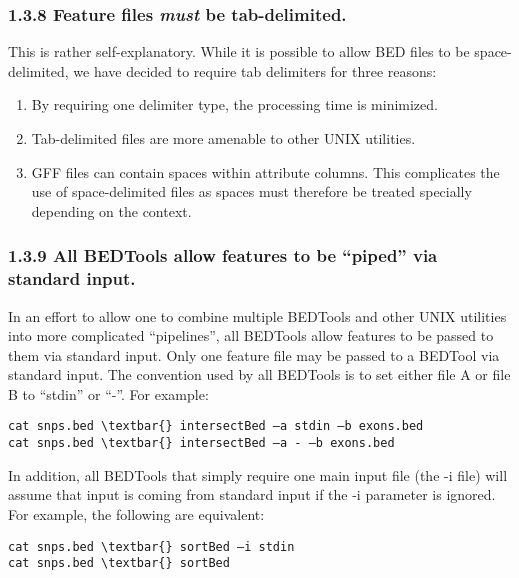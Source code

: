\documentclass[letterpaper,10pt,english]{sphinxmanual}
\begin{document}
\subsubsection{1.3.8 Feature files \emph{must} be tab-delimited.}
\label{content/overview:feature-files-must-be-tab-delimited}
This is rather self-explanatory. While it is possible to allow BED files to be space-delimited, we have decided to require tab delimiters for three reasons:
\begin{enumerate}
\item {} 
By requiring one delimiter type, the processing time is minimized.

\item {} 
Tab-delimited files are more amenable to other UNIX utilities.

\item {} 
GFF files can contain spaces within attribute columns. This complicates the use of space-delimited files as spaces must therefore be treated specially depending on the context.

\end{enumerate}


\subsubsection{1.3.9 All BEDTools allow features to be “piped” via standard input.}
\label{content/overview:all-bedtools-allow-features-to-be-piped-via-standard-input}
In an effort to allow one to combine multiple BEDTools and other UNIX utilities into more complicated “pipelines”, all BEDTools allow features
to be passed to them via standard input. Only one feature file may be passed to a BEDTool via standard input.
The convention used by all BEDTools is to set either file A or file B to “stdin” or ``-''. For example:

\begin{Verbatim}[commandchars=\\\{\}]
cat snps.bed \textbar{} intersectBed –a stdin –b exons.bed
cat snps.bed \textbar{} intersectBed –a - –b exons.bed
\end{Verbatim}

In addition, all BEDTools that simply require one main input file (the -i file) will assume that input is
coming from standard input if the -i parameter is ignored. For example, the following are equivalent:

\begin{Verbatim}[commandchars=\\\{\}]
cat snps.bed \textbar{} sortBed –i stdin
cat snps.bed \textbar{} sortBed
\end{Verbatim}
\end{document}
